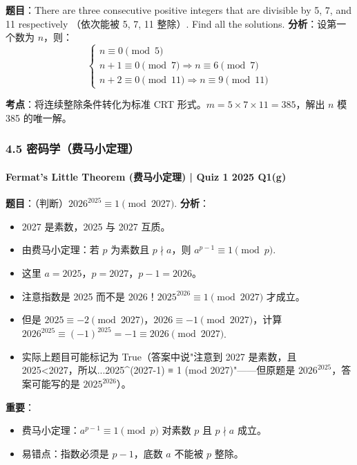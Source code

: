 \documentclass[10pt,a4paper,openany]{ctexbook}
\theoremstyle{definition}
\theoremstyle{remark}
\begin{document}
\textbf{题目}：There are three consecutive positive integers that are divisible by 5, 7, and 11 respectively （依次能被 5, 7, 11 整除）. Find all the solutions.
\textbf{分析}：设第一个数为 $n$，则：
\[
\begin{cases}
n \equiv 0 \pmod{5} \\
n+1 \equiv 0 \pmod{7} \Rightarrow n \equiv 6 \pmod{7} \\
n+2 \equiv 0 \pmod{11} \Rightarrow n \equiv 9 \pmod{11}
\end{cases}
\]

\textbf{考点}：将连续整除条件转化为标准 CRT 形式。$m = 5 \times 7 \times 11 = 385$，解出 $n$ 模 385 的唯一解。
\vspace{-2pt}

\subsubsection{4.5 密码学（费马小定理）}

\paragraph{Fermat's Little Theorem (费马小定理) | Quiz 1 2025 Q1(g)}

\textbf{题目}：（判断）$2026^{2025} \equiv 1 \pmod{2027}$.
\textbf{分析}：
\begin{itemize}
\item 2027 是素数，2025 与 2027 互质。
\item 由费马小定理：若 $p$ 为素数且 $p \nmid a$，则 $a^{p-1} \equiv 1 \pmod{p}$.
\item 这里 $a = 2025$，$p = 2027$，$p-1 = 2026$。
\item 注意指数是 2025 而不是 2026！$2025^{2026} \equiv 1 \pmod{2027}$ 才成立。
\item 但是 $2025 \equiv -2 \pmod{2027}$，$2026 \equiv -1 \pmod{2027}$，计算 $2026^{2025} \equiv (-1)^{2025} = -1 \equiv 2026 \pmod{2027}$.
\item 实际上题目可能标记为 True（答案中说"注意到 2027 是素数，且 2025<2027，所以...2025\^{}(2027-1) ≡ 1 (mod 2027)"——但原题是 $2026^{2025}$，答案可能写的是 $2025^{2026}$）。

\end{itemize}

\textbf{重要}：
\begin{itemize}
\item 费马小定理：$a^{p-1} \equiv 1 \pmod{p}$ 对素数 $p$ 且 $p \nmid a$ 成立。
\item 易错点：指数必须是 $p-1$，底数 $a$ 不能被 $p$ 整除。

\end{itemize}
\end{document}
